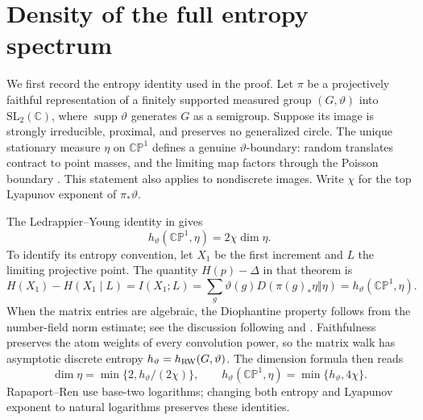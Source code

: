 \documentclass[11pt,letterpaper]{amsart}
\theoremstyle{definition}
\theoremstyle{remark}
\numberwithin{equation}{section}
\newcommand{\CP}{\mathbb{CP}}
\begin{document}
\section{Density of the full entropy spectrum}\label{sec:density}

We first record the entropy identity used in the proof. Let $\pi$ be a
projectively faithful representation of a finitely supported measured
group $(G,\vartheta)$ into $\mathrm{SL}_2(\mathbb C)$, where
$\operatorname{supp}\vartheta$ generates $G$ as a semigroup. Suppose its image
is strongly irreducible, proximal, and preserves no generalized circle.
The unique stationary measure $\eta$ on $\CP^1$ defines a genuine
$\vartheta$-boundary: random translates contract to point masses, and
the limiting map factors through the Poisson boundary
\cite[Theorem 2.3]{DF}. This statement also applies to nondiscrete images.
Write $\chi$ for the top Lyapunov exponent of $\pi_*\vartheta$.

The Ledrappier--Young identity in \cite[Theorem 2.14]{RR} gives
\begin{equation}\label{eq:ledrappier-young}
 h_\vartheta(\CP^1,\eta)=2\chi\dim\eta.
\end{equation}
To identify its entropy convention, let $X_1$ be the first increment
and $L$ the limiting projective point. The quantity $H(p)-\Delta$ in
that theorem is
\[
 H(X_1)-H(X_1\mid L)=I(X_1;L)
 =\sum_g\vartheta(g)D(\pi(g)_*\eta\Vert\eta)
 =h_\vartheta(\CP^1,\eta).
\]
When the matrix entries are algebraic, the Diophantine property follows
from the number-field norm estimate; see the discussion following
\cite[Definition 1.1]{RR} and \cite[Lemma 6.1]{HS}.
Faithfulness preserves the atom weights of every convolution power,
so the matrix walk has asymptotic discrete entropy
$h_\vartheta=h_{\rm RW}(G,\vartheta)$. The dimension formula
\cite[Theorem 1.2]{RR} then reads
\begin{equation}\label{eq:general-good-entropy}
 \dim\eta=\min\{2,h_\vartheta/(2\chi)\},
 \qquad h_\vartheta(\CP^1,\eta)=\min\{h_\vartheta,4\chi\}.
\end{equation}
Rapaport--Ren use base-two logarithms; changing both entropy and
Lyapunov exponent to natural logarithms preserves these identities.
\end{document}
